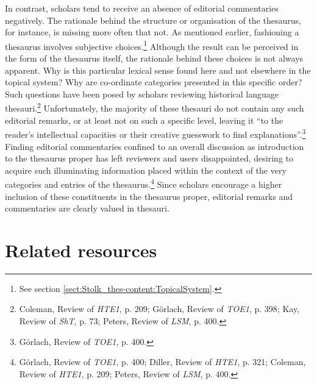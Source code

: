 In contrast, scholars tend to receive an absence of editorial commentaries negatively.
The rationale behind the structure or organisation of the thesaurus, for instance, is missing more often that not.
As mentioned earlier, fashioning a thesaurus involves subjective choices.\footnote{See section \ref{sect:Stolk_thes-content:TopicalSystem}.} Although the result can be perceived in the form of the thesaurus itself, the  rationale behind these choices is not always apparent. Why is this particular lexical sense found here and not  elsewhere in the topical system? Why are co-ordinate  categories presented in this specific order? Such  questions have been posed by scholars reviewing historical language thesauri.\footnote{Coleman, Review of \textit{HTE1}, p. 209; Görlach, Review of \textit{TOE1}, p. 398; Kay, Review of \textit{ShT}, p. 73; Peters, Review of \textit{LSM}, p. 400.} Unfortunately, the  majority of these thesauri do not contain any such  editorial remarks, or at least not on such a specific level, leaving it ``to the reader's intellectual capacities or their creative guesswork to find  explanations''.\footnote{Görlach, Review of \textit{TOE1}, p. 400.}
Finding editorial commentaries confined to an overall discussion as introduction to the thesaurus proper has left reviewers and users disappointed, desiring to acquire such illuminating information placed within the context of the very categories and entries of the thesaurus.\footnote{Görlach, Review of \textit{TOE1}, p. 400; Diller, Review of \textit{HTE1}, p. 321; Coleman, Review of \textit{HTE1}, p. 209; Peters, Review of \textit{LSM}, p. 400.}
Since scholars encourage a higher inclusion of these constituents in the thesaurus proper, editorial remarks and commentaries are clearly valued in thesauri.



\section{Related resources}
\label{sect:Stolk_thes-content:RelatedResources}

